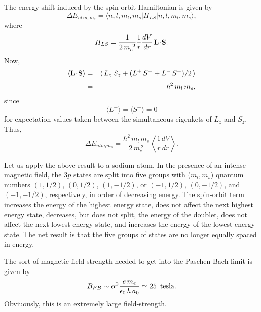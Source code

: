 The energy-shift induced by the spin-orbit Hamiltonian is
given by
\begin{equation}
\Delta E_{nl\,m_l \,m_s} = \langle  n,l,m_l, m_s|H_{LS}| n,l,m_l, m_s\rangle,
\end{equation}
where
\begin{equation}
H_{LS} = \frac{1}{2 \,m_e^{~2}} \frac{1}{r} \frac{dV}{dr} \,{\bf L}\!\cdot
\! {\bf S}.
\end{equation}
Now,
\begin{eqnarray}
\langle {\bf L}\!\cdot\! {\bf S}\rangle &=& \langle\, L_z \,S_z + (L^+\, S^- 
+ L^- \,S^+)/2\,
\rangle\nonumber \\[0.5ex]
&=& \hbar^2\, m_l\, m_s,
\end{eqnarray}
since
\begin{equation}
\langle L^\pm \rangle = \langle S^\pm\rangle = 0
\end{equation}
for expectation values taken between the simultaneous eigenkets of
$L_z$ and $S_z$. 
Thus,
\begin{equation}
\Delta E_{nl m_l m_s} = \frac{\hbar^2\, m_l \,m_s}
{2 \,m_e^{~2}} \left\langle \frac{1}{r} \frac{d V}{dr}\right\rangle.
\end{equation}

Let us apply the above result to a sodium atom. In the presence of
an intense magnetic field, the $3p$ states are split into five
groups with ($m_l,m_s$) quantum numbers $(1,1/2)$, $(0,1/2)$, $(1,-1/2)$,
or $(-1, 1/2)$, $(0,-1/2)$, and $(-1,-1/2)$, respectively, in order of
decreasing energy. The spin-orbit term increases the energy of
the highest energy state, does not affect the next highest energy state,
decreases, but does not split, the energy of the doublet, does
not affect the next lowest energy state, and increases 
the energy of the lowest
energy state. The net result is that the five groups of states are no
longer equally spaced in energy. 

The sort of magnetic field-strength needed to get into the Paschen-Bach limit
is given by
\begin{equation}
B_{PB} \sim \alpha^2 \frac{e\, m_e}{\epsilon_0\, h \,a_0} 
\simeq 25\,\,\,{\rm tesla}.
\end{equation}
Obviuously, this is an extremely large field-strength.

